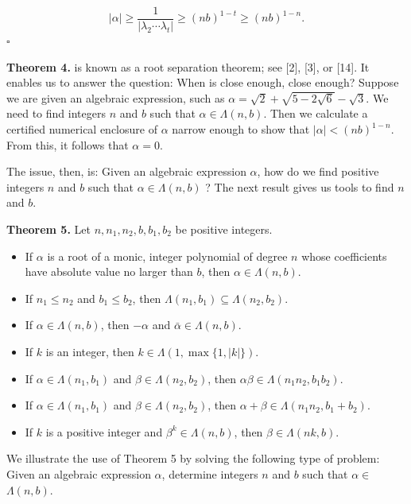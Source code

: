\documentclass[11pt,letterpaper]{article}
\begin{document}
\[
|\alpha| \geq \frac{1}{\left|\lambda_{2} \cdots \lambda_{t}\right|} \geq(n b)^{1-t} \geq(n b)^{1-n} .
\] \(\square\)

\noindent\textbf{Theorem 4.} is known as a root separation theorem; see [2], [3], or [14]. It enables us to answer the question: When is close enough, close enough? Suppose we are given an algebraic expression, such as $\alpha=\sqrt{2}+\sqrt{5-2 \sqrt{6}}-\sqrt{3}$. We need to find integers $n$ and $b$ such that $\alpha \in \Lambda(n, b)$. Then we calculate a certified numerical enclosure of $\alpha$ narrow enough to show that $|\alpha|<(n b)^{1-n}$. From this, it follows that $\alpha=0$.

The issue, then, is: Given an algebraic expression $\alpha$, how do we find positive integers $n$ and $b$ such that $\alpha \in \Lambda(n, b)$ ? The next result gives us tools to find $n$ and $b$.

\noindent\textbf{Theorem 5.} Let $n, n_{1}, n_{2}, b, b_{1}, b_{2}$ be positive integers.

\begin{itemize}
  \item[] [1] If $\alpha$ is a root of a monic, integer polynomial of degree $n$ whose coefficients have absolute value no larger than $b$, then $\alpha \in \Lambda(n, b)$.
  \item[] [2] If $n_{1} \leq n_{2}$ and $b_{1} \leq b_{2}$, then $\Lambda\left(n_{1}, b_{1}\right) \subseteq \Lambda\left(n_{2}, b_{2}\right)$.
  \item[] [3] If $\alpha \in \Lambda(n, b)$, then $-\alpha$ and $\bar{\alpha} \in \Lambda(n, b)$.
  \item[] [4] If $k$ is an integer, then $k\in\Lambda(1,\max\{1,|k|\})$.
  \item[] [5] If $\alpha \in \Lambda\left(n_{1}, b_{1}\right)$ and $\beta \in \Lambda\left(n_{2}, b_{2}\right)$, then $\alpha \beta \in \Lambda\left(n_{1} n_{2}, b_{1} b_{2}\right)$.
  \item[] [6] If $\alpha \in \Lambda\left(n_{1}, b_{1}\right)$ and $\beta \in \Lambda\left(n_{2}, b_{2}\right)$, then $\alpha+\beta \in \Lambda\left(n_{1} n_{2}, b_{1}+b_{2}\right)$.
  \item[] [7] If $k$ is a positive integer and $\beta^{k} \in \Lambda(n, b)$, then $\beta \in \Lambda(n k, b)$.
\end{itemize}

We illustrate the use of Theorem 5 by solving the following type of problem: Given an algebraic expression $\alpha$, determine integers $n$ and $b$ such that $\alpha \in$ $\Lambda(n, b)$.
\end{document}
